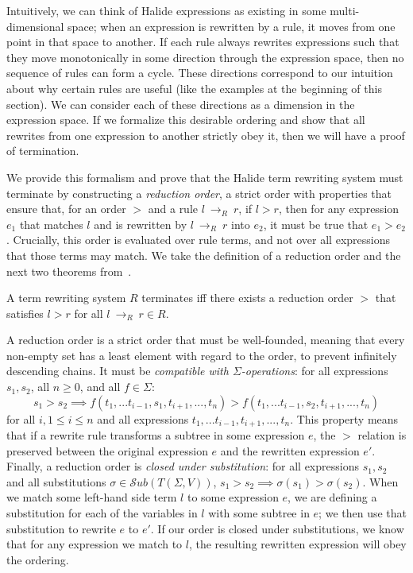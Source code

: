 \documentclass[acmsmall,review]{acmart}\settopmatter{printfolios=true,printccs=false,printacmref=false}
\newcommand{\rewrites}[0]{\:\rightarrow_{R}\:}
\begin{document}
Intuitively, we can think of Halide expressions as existing in some multi-dimensional space; when an expression is rewritten by a rule, it moves from one point in that space to another. If each rule always rewrites expressions such that they move monotonically in some direction through the expression space, then no sequence of rules can form a cycle. These directions correspond to our intuition about why certain rules are useful (like the examples at the beginning of this section). We can consider each of these directions as a dimension in the expression space. If we formalize this desirable ordering and show that all rewrites from one expression to another strictly obey it, then we will have a proof of termination.

We provide this formalism and prove that the Halide term rewriting system must terminate by constructing a \emph{reduction order}, a strict order with properties that ensure that, for an order $>$ and a rule $l \rewrites r$, if $l > r$, then for any expression $e_1$ that matches $l$ and is rewritten by $l \rewrites r$ into $e_2$, it must be true that $e_1 > e_2$. Crucially, this order is evaluated over rule terms, and not over all expressions that those terms may match. We take the definition of a reduction order and the next two theorems from~\citet{baader1999term}.

\begin{theorem}\label{theorem:terminates}
A term rewriting system $R$ terminates iff there exists a reduction order $>$ that satisfies $l > r$ for all $l \rewrites r \in R$.
\end{theorem}

A reduction order is a strict order that must be well-founded, meaning that every non-empty set has a least element with regard to the order, to prevent infinitely descending chains. It must be \emph{compatible with $\Sigma$-operations}: for all expressions $s_1, s_2$, all $n \geq 0$, and all $f \in \Sigma$:
\[
s_1 > s_2 \implies f(t_1,...t_{i-1},s_1,t_{i+1},...,t_n) > f(t_1,...t_{i-1},s_2,t_{i+1},...,t_n)
\]
for all $i, 1 \leq i \leq n$ and all expressions $t_1,...t_{i-1},t_{i+1},...,t_n$. This property means that if a rewrite rule transforms a subtree in some expression $e$, the $>$ relation is preserved between the original expression $e$ and the rewritten expression $e'$. Finally, a reduction order is \emph{closed under substitution}: for all expressions $s_1, s_2$ and all substitutions $\sigma \in \mathcal{S}ub(T(\Sigma,V))$, 
$s_1 > s_2 \implies \sigma(s_1) > \sigma(s_2)$. When we match some left-hand side term $l$ to some expression $e$, we are defining a substitution for each of the variables in $l$ with some subtree in $e$; we then use that substitution to rewrite $e$ to $e'$. If our order is closed under substitutions, we know that for any expression we match to $l$, the resulting rewritten expression will obey the ordering.
\end{document}

